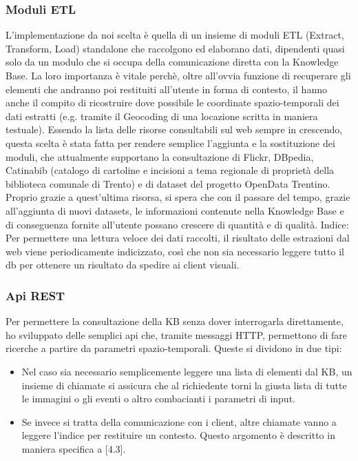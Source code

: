 \documentclass[sigproc-sp.tex]{subfiles}
\begin{document}
\subsubsection{Moduli ETL}
L’implementazione da noi scelta è quella di un insieme di moduli ETL (Extract, Transform, Load) standalone che raccolgono ed elaborano dati, dipendenti quasi solo da un modulo che si occupa della comunicazione diretta con la Knowledge Base. La loro importanza è vitale perchè, oltre all’ovvia funzione di recuperare gli elementi che andranno poi restituiti all’utente in forma di contesto, il hanno anche il compito di ricostruire dove possibile le coordinate spazio-temporali dei dati estratti (e.g. tramite il Geocoding di una locazione scritta in maniera testuale). Essendo la lista delle risorse consultabili sul web sempre in crescendo, questa scelta è stata fatta per rendere semplice l’aggiunta e la sostituzione dei moduli, che attualmente supportano la consultazione di Flickr, DBpedia, Catinabib (catalogo di cartoline e incisioni a tema regionale di proprietà della biblioteca comunale di Trento) e di dataset del progetto OpenData Trentino. Proprio grazie a quest’ultima risorsa, si spera che con il passare del tempo, grazie all’aggiunta di nuovi datasets, le informazioni contenute nella Knowledge Base e di conseguenza fornite all’utente possano crescere di quantità e di qualità. 
Indice: Per permettere una lettura veloce dei dati raccolti, il risultato delle estrazioni dal web viene periodicamente indicizzato, così che non sia necessario leggere tutto il db per ottenere un risultato da spedire ai client visuali.

\subsubsection{Api REST}
Per permettere la consultazione della KB senza dover interrogarla direttamente, ho sviluppato delle semplici api che, tramite messaggi HTTP, permettono di fare ricerche a partire da parametri spazio-temporali. Queste si dividono in due tipi:
\begin{itemize}
\item Nel caso sia necessario semplicemente leggere una lista di elementi dal KB, un insieme di chiamate si assicura che al richiedente torni la giusta lista di tutte le immagini o gli eventi o altro combacianti i parametri di input.
\item Se invece si tratta della comunicazione con i client, altre chiamate vanno a leggere l’indice per restituire un contesto. Questo argomento è descritto in maniera specifica a [4.3].
\end{itemize}
\end{document}
